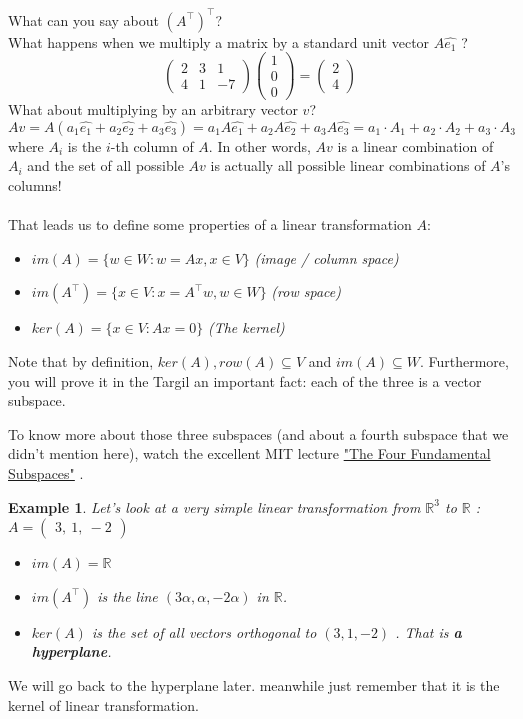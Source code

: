 \documentclass[11pt, oneside]{article}   	%
\newtheorem{example}[lemma]{Example}
\begin{document}
 What can you say about $(A^\top)^\top$?
~\\ 
  What happens when we multiply a matrix by a standard unit vector $A\hat{e_1}$ ?
\[
  \left( \begin{array}{ccc}
2 & 3 & 1\\
4 & 1  & -7 \end{array} \right) 
\left( \begin{array}{ccc}
1\\
0\\
0 \end{array} \right) =
\left( \begin{array}{ccc}
2\\
4 \end{array} \right) 
\]
  What about multiplying by an arbitrary vector $v$? 
  $$Av=A \left( a_1\hat{e_1}+a_2\hat{e_2}+a_3\hat{e_3}\right)=a_1A\hat{e_1}+a_2A\hat{e_2}+a_3A\hat{e_3}=a_1\cdot A_1+a_2\cdot A_2+a_3\cdot A_3$$
where $A_i$ is the $i$-th column of $A$. In other words, $Av$   is a linear combination of $A_i$ and the set of all possible $Av$ is actually all possible linear combinations of $A$'s columns! \\
~\\
 That leads us to define some properties of a linear transformation $A$:\\
\begin{itemize}
\item $im(A)=\{w\in W:w=Ax,x\in V\}$    \textit{(image / column space)}
\item $im(A^\top)=\{x\in V:x=A^\top w,w\in W\}$    \textit{(row space)}
\item $ker(A)=\{x\in V:Ax=0\}$  \textit{(The kernel)}
\end{itemize}

Note that by definition, $ker(A), row(A)\subseteq V$ and $im(A)\subseteq W$. Furthermore, you will prove it in the Targil an important fact:  each of the three is a vector subspace.

To know more about those three subspaces (and about a fourth subspace that we didn't mention here), watch the excellent MIT lecture \href{https://youtu.be/nHlE7EgJFds}{"The Four Fundamental Subspaces"} .
\begin{example}
Let's look at a very simple linear transformation from $\mathbb R^3$ to $\mathbb R$ : $A=\left( \begin{array}{ccc}
3,\
1,\
-2\end{array} \right) $
\begin{itemize}
\item $im(A)=\mathbb R$ 
\item $im(A^\top)$ is the line $(3\alpha ,\alpha ,-2\alpha )$  in $\mathbb R$.
\item $ker(A)$ is the set of all vectors orthogonal to $(3,1 ,-2)$ . That is \textbf{a hyperplane}. 
\end{itemize}
\end{example}
We will go back to the hyperplane later. meanwhile just remember that it is the kernel of linear transformation.\\
\end{document}
